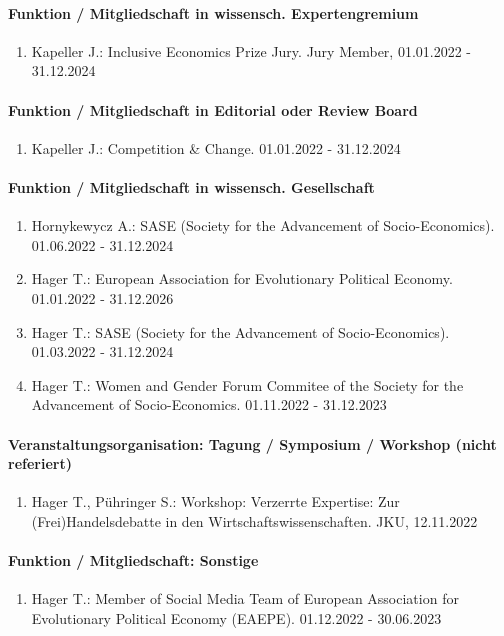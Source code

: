 \paragraph{Funktion / Mitgliedschaft in wissensch. Expertengremium}
\begin{enumerate}[leftmargin=*, labelsep=0.5cm]
\item Kapeller J.: Inclusive Economics Prize Jury. Jury Member, 01.01.2022 - 31.12.2024
\end{enumerate}
\paragraph{Funktion / Mitgliedschaft in Editorial oder Review Board}
\begin{enumerate}[leftmargin=*, labelsep=0.5cm]
\item Kapeller J.: Competition \& Change. 01.01.2022 - 31.12.2024
\end{enumerate}
\paragraph{Funktion / Mitgliedschaft in wissensch. Gesellschaft}
\begin{enumerate}[leftmargin=*, labelsep=0.5cm]
\item Hornykewycz A.: SASE (Society for the Advancement of Socio-Economics). 01.06.2022 - 31.12.2024
\item Hager T.: European Association for Evolutionary Political Economy. 01.01.2022 - 31.12.2026
\item Hager T.: SASE (Society for the Advancement of Socio-Economics). 01.03.2022 - 31.12.2024
\item Hager T.: Women and Gender Forum Commitee of the Society for the Advancement of Socio-Economics. 01.11.2022 - 31.12.2023
\end{enumerate}
\paragraph{Veranstaltungsorganisation: Tagung / Symposium / Workshop (nicht referiert)}
\begin{enumerate}[leftmargin=*, labelsep=0.5cm]
\item Hager T., Pühringer S.: Workshop: Verzerrte Expertise: Zur (Frei)Handelsdebatte in den Wirtschaftswissenschaften. JKU, 12.11.2022
\end{enumerate}
\paragraph{Funktion / Mitgliedschaft: Sonstige}
\begin{enumerate}[leftmargin=*, labelsep=0.5cm]
\item Hager T.: Member of Social Media Team of European Association for Evolutionary Political Economy (EAEPE). 01.12.2022 - 30.06.2023
\end{enumerate}
